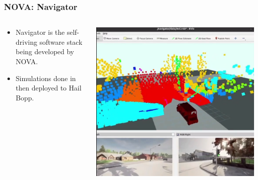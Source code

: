 \documentclass[aspectratio=169]{beamer}
\begin{document}
\begin{frame}
	\frametitle{NOVA: Navigator \cite{nova}}
	\begin{columns}
		\begin{column}{0.6\textwidth}
			\begin{itemize}
				\item Navigator is the self-driving software stack being developed by NOVA.
				\item Simulations done in then deployed to Hail Bopp.
			\end{itemize}
		\end{column}
		\begin{column}{0.4\textwidth}
			\includegraphics[width = \columnwidth]{figs/NOVA-carla_screenshot.png}
		\end{column}
	\end{columns}
\end{frame}
\end{document}
